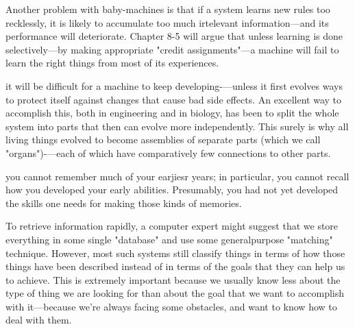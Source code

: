 \documentclass[10pt,a4paper]{article}
\begin{document}
Another problem with baby-machines is that if a system learns new rules too recklessly, it is likely to accumulate too much irtelevant information—and its performance will deteriorate. Chapter 8-5 will argue that unless learning is done selectively—by making appropriate "credit assignments"—a machine will fail to learn the right things from most of its experiences. \cite[p.~179]{minsky}

it will be difficult for a machine to keep developing-—unless it first evolves ways to protect itself against changes that cause bad side effects. An excellent way to accomplish this, both in engineering and in biology, has been to split the whole system into parts that then can evolve more independently. This surely is why all living things evolved to become assemblies of separate parts (which we call "organs")-—each of which have comparatively few connections to other parts. \cite[p.~181]{minsky}

you cannot remember much of your earjiesr years; in particular, you cannot recall how you developed your early abilities. Presumably, you had not yet developed the skills one needs for making those kinds of memories. \cite[p.~182]{minsky}

To retrieve information rapidly, a computer expert might suggest
that we store everything in some single "database" and use some generalpurpose "matching" technique. However, most such systems still classify things in terms of how those things have been described instead of in terms of the goals that they can help us to achieve. This is extremely important because we usually know less about the type of thing we are looking for than about the goal that we want to accomplish with it—because we're always facing some obstacles, and want to know how to deal with them. \cite[p.~183]{minsky}
\end{document}
